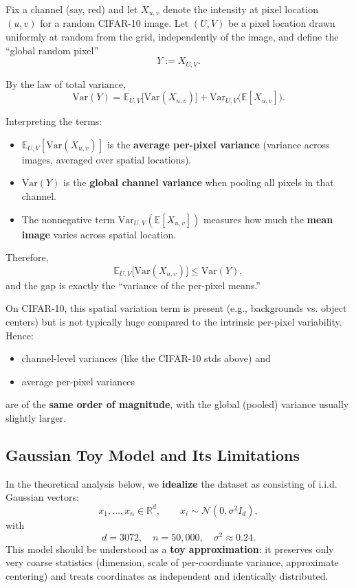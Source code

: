 \documentclass[11pt]{article}
\begin{document}
Fix a channel (say, red) and let $X_{u,v}$ denote the intensity at pixel location $(u,v)$ for a random CIFAR-10 image. Let $(U,V)$ be a pixel location drawn uniformly at random from the grid, independently of the image, and define the ``global random pixel''
\begin{equation}
Y := X_{U,V}.
\end{equation}

By the law of total variance,
\begin{equation}
\mathrm{Var}(Y)= \mathbb{E}_{U,V}\bigl[\mathrm{Var}(X_{u,v})\bigr] + \mathrm{Var}_{U,V}\bigl(\mathbb{E}[X_{u,v}]\bigr).
\end{equation}

Interpreting the terms:
\begin{itemize}
\item $\mathbb{E}_{U,V}[\mathrm{Var}(X_{u,v})]$ is the \textbf{average per-pixel variance} (variance across images, averaged over spatial locations).
\item $\mathrm{Var}(Y)$ is the \textbf{global channel variance} when pooling all pixels in that channel.
\item The nonnegative term $\mathrm{Var}_{U,V}(\mathbb{E}[X_{u,v}])$ measures how much the \textbf{mean image} varies across spatial location.
\end{itemize}

Therefore,
\begin{equation}
\mathbb{E}_{U,V}\bigl[\mathrm{Var}(X_{u,v})\bigr] \le \mathrm{Var}(Y),
\end{equation}
and the gap is exactly the ``variance of the per-pixel means.''

On CIFAR-10, this spatial variation term is present (e.g., backgrounds vs. object centers) but is not typically huge compared to the intrinsic per-pixel variability. Hence:
\begin{itemize}
\item channel-level variances (like the CIFAR-10 stds above) and
\item average per-pixel variances
\end{itemize}
are of the \textbf{same order of magnitude}, with the global (pooled) variance usually slightly larger.

\subsection{Gaussian Toy Model and Its Limitations}\label{sec-gaussian-toy-model}
In the theoretical analysis below, we \textbf{idealize} the dataset as consisting of i.i.d. Gaussian vectors:
\begin{equation}
x_1, \dots, x_n \in \mathbb{R}^d,
\qquad
x_i \sim \mathcal{N}(0, \sigma^2 I_d),
\end{equation}
with
\begin{equation}
d = 3072,
\quad
n = 50{,}000,
\quad
\sigma^2 \approx 0.24.
\end{equation}
This model should be understood as a \textbf{toy approximation}: it preserves only very coarse statistics (dimension, scale of per-coordinate variance, approximate centering) and treats coordinates as independent and identically distributed.
\end{document}
